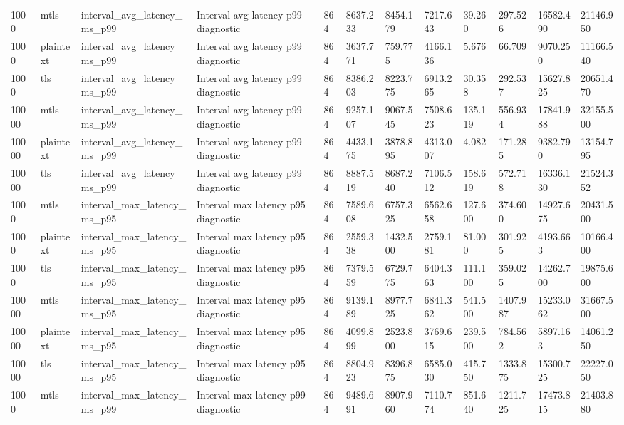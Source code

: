 \begin{longtable}{llllllllllll}
1000 & mtls & interval\_avg\_latency\_ms\_p99 & Interval avg latency p99 diagnostic & 864 & 8637.233 & 8454.179 & 7217.643 & 39.260 & 297.526 & 16582.490 & 21146.950 \\
1000 & plaintext & interval\_avg\_latency\_ms\_p99 & Interval avg latency p99 diagnostic & 864 & 3637.771 & 759.775 & 4166.136 & 5.676 & 66.709 & 9070.250 & 11166.540 \\
1000 & tls & interval\_avg\_latency\_ms\_p99 & Interval avg latency p99 diagnostic & 864 & 8386.203 & 8223.775 & 6913.265 & 30.358 & 292.537 & 15627.825 & 20651.470 \\
10000 & mtls & interval\_avg\_latency\_ms\_p99 & Interval avg latency p99 diagnostic & 864 & 9257.107 & 9067.545 & 7508.623 & 135.119 & 556.934 & 17841.988 & 32155.500 \\
10000 & plaintext & interval\_avg\_latency\_ms\_p99 & Interval avg latency p99 diagnostic & 864 & 4433.175 & 3878.895 & 4313.007 & 4.082 & 171.285 & 9382.790 & 13154.795 \\
10000 & tls & interval\_avg\_latency\_ms\_p99 & Interval avg latency p99 diagnostic & 864 & 8887.519 & 8687.240 & 7106.512 & 158.619 & 572.718 & 16336.130 & 21524.352 \\
1000 & mtls & interval\_max\_latency\_ms\_p95 & Interval max latency p95 diagnostic & 864 & 7589.608 & 6757.325 & 6562.658 & 127.600 & 374.600 & 14927.675 & 20431.500 \\
1000 & plaintext & interval\_max\_latency\_ms\_p95 & Interval max latency p95 diagnostic & 864 & 2559.338 & 1432.500 & 2759.181 & 81.000 & 301.925 & 4193.663 & 10166.400 \\
1000 & tls & interval\_max\_latency\_ms\_p95 & Interval max latency p95 diagnostic & 864 & 7379.559 & 6729.775 & 6404.363 & 111.100 & 359.025 & 14262.700 & 19875.600 \\
10000 & mtls & interval\_max\_latency\_ms\_p95 & Interval max latency p95 diagnostic & 864 & 9139.189 & 8977.725 & 6841.362 & 541.500 & 1407.987 & 15233.062 & 31667.500 \\
10000 & plaintext & interval\_max\_latency\_ms\_p95 & Interval max latency p95 diagnostic & 864 & 4099.899 & 2523.800 & 3769.615 & 239.500 & 784.562 & 5897.163 & 14061.250 \\
10000 & tls & interval\_max\_latency\_ms\_p95 & Interval max latency p95 diagnostic & 864 & 8804.923 & 8396.875 & 6585.030 & 415.750 & 1333.875 & 15300.725 & 22227.050 \\
1000 & mtls & interval\_max\_latency\_ms\_p99 & Interval max latency p99 diagnostic & 864 & 9489.691 & 8907.960 & 7110.774 & 851.640 & 1211.725 & 17473.815 & 21403.880 \\

\end{longtable}
